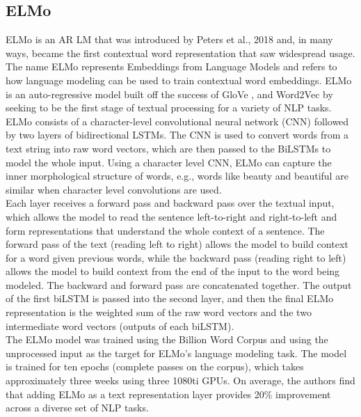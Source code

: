 \subsection{ELMo}
\label{chap:prior:sec:lm:elmo}
ELMo is an AR LM that was introduced by Peters et al., 2018 \cite{Peters2018DeepCW} and, in many ways, became the first contextual word representation that saw widespread usage. The name ELMo represents Embeddings from Language Models and refers to how language modeling can be used to train contextual word embeddings. ELMo is an auto-regressive model built off the success of GloVe \cite{Pennington2014GloveGV}, and Word2Vec \cite{Mikolov2013EfficientEO} by seeking to be the first stage of textual processing for a variety of NLP tasks. ELMo consists of a character-level convolutional neural network (CNN) followed by two layers of bidirectional LSTMs. The CNN is used to convert words from a text string into raw word vectors, which are then passed to the BiLSTMs to model the whole input. Using a character level CNN, ELMo can capture the inner morphological structure of words, e.g., words like beauty and beautiful are similar when character level convolutions are used.\\
Each layer receives a forward pass and backward pass over the textual input, which allows the model to read the sentence left-to-right and right-to-left and form representations that understand the whole context of a sentence. The forward pass of the text (reading left to right) allows the model to build context for a word given previous words, while the backward pass (reading right to left) allows the model to build context from the end of the input to the word being modeled. The backward and forward pass are concatenated together. The output of the first biLSTM is passed into the second layer, and then the final ELMo representation is the weighted sum of the raw word vectors and the two intermediate word vectors (outputs of each biLSTM).\\ 
The ELMo model was trained using the Billion Word Corpus \cite{Chelba2014OneBW} and using the unprocessed input as the target for ELMo's language modeling task. The model is trained for ten epochs (complete passes on the corpus), which takes approximately three weeks using three 1080ti GPUs. On average, the authors find that adding ELMo as a text representation layer provides 20\% improvement across a diverse set of NLP tasks.
